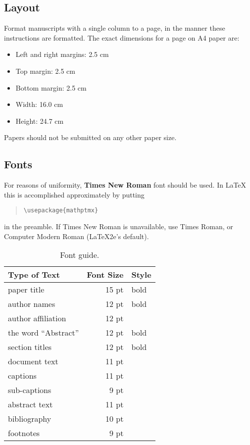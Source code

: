 \documentclass[11pt]{article}
\begin{document}
\subsection{Layout}
\label{ssec:layout}

Format manuscripts with a single column to a page, in the manner these instructions are formatted. The exact dimensions for a page on A4 paper are:

\begin{itemize}
\item Left and right margins: 2.5 cm
\item Top margin: 2.5 cm
\item Bottom margin: 2.5 cm
\item Width: 16.0 cm
\item Height: 24.7 cm
\end{itemize}

\noindent Papers should not be submitted on any other paper size.


\subsection{Fonts}

For reasons of uniformity, \textbf{Times New Roman} font should be used. In LaTeX this is accomplished approximately by putting

\begin{quote}
\begin{verbatim}
\usepackage{mathptmx}
\end{verbatim}
\end{quote}
in the preamble. If Times New Roman is unavailable, use Times Roman, or Computer Modern Roman (LaTeX2e's default).

\begin{table}[ht]
\begin{center}
\begin{tabular}{|l|rl|}
\hline \textbf{Type of Text} & \textbf{Font Size} & \textbf{Style} \\ \hline
paper title & 15 pt & bold \\
author names & 12 pt & bold \\
author affiliation & 12 pt & \\
the word ``Abstract'' & 12 pt & bold \\
section titles & 12 pt & bold \\
document text & 11 pt  &\\
captions & 11 pt & \\
sub-captions & 9 pt & \\
abstract text & 11 pt & \\
bibliography & 10 pt & \\
footnotes & 9 pt & \\
\hline
\end{tabular}
\end{center}
\caption{\label{font-table} Font guide. }
\end{table}
\end{document}
